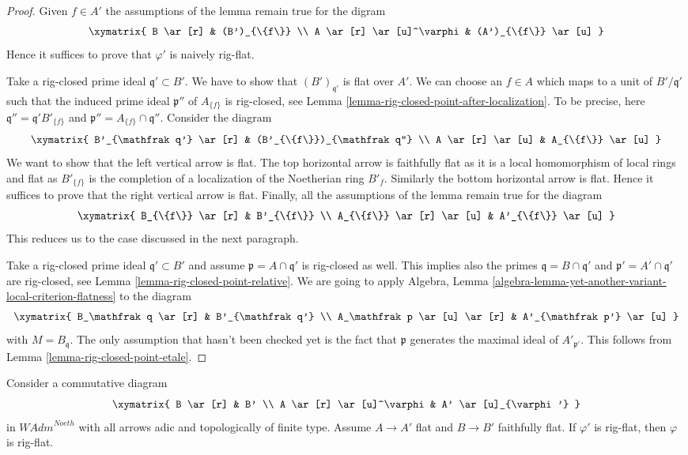 \begin{proof}
Given $f \in A'$ the assumptions of the lemma remain true for the digram
$$
\xymatrix{
B \ar[r] & (B')_{\{f\}} \\
A \ar[r] \ar[u]^\varphi & (A')_{\{f\}} \ar[u]
}
$$
Hence it suffices to prove that $\varphi'$ is naively rig-flat.

\medskip\noindent
Take a rig-closed prime ideal $\mathfrak q' \subset B'$.
We have to show that $(B')_{\mathfrak q'}$ is flat over $A'$.
We can choose an $f \in A$ which maps to a unit of $B'/\mathfrak q'$
such that the induced prime ideal $\mathfrak p''$ of $A_{\{f\}}$ 
is rig-closed, see Lemma \ref{lemma-rig-closed-point-after-localization}.
To be precise, here $\mathfrak q'' = \mathfrak q' B'_{\{f\}}$ and
$\mathfrak p'' = A_{\{f\}} \cap \mathfrak q''$.
Consider the diagram
$$
\xymatrix{
B'_{\mathfrak q'} \ar[r] &
(B'_{\{f\}})_{\mathfrak q''} \\
A \ar[r] \ar[u] &
A_{\{f\}} \ar[u]
}
$$
We want to show that the left vertical arrow is flat.
The top horizontal arrow is faithfully flat as it is a local
homomorphism of local rings and flat as $B'_{\{f\}}$
is the completion of a localization of the Noetherian ring
$B'_f$. Similarly the bottom horizontal arrow is flat.
Hence it suffices to prove that the right vertical arrow is flat.
Finally, all the assumptions of the lemma remain true for the diagram
$$
\xymatrix{
B_{\{f\}} \ar[r] &
B'_{\{f\}} \\
A_{\{f\}} \ar[r] \ar[u] &
A'_{\{f\}} \ar[u]
}
$$
This reduces us to the case discussed in the next paragraph.

\medskip\noindent
Take a rig-closed prime ideal $\mathfrak q' \subset B'$
and assume $\mathfrak p = A \cap \mathfrak q'$ is rig-closed as well.
This implies also the primes $\mathfrak q = B \cap \mathfrak q'$
and $\mathfrak p' = A' \cap \mathfrak q'$ are rig-closed, see
Lemma \ref{lemma-rig-closed-point-relative}.
We are going to apply
Algebra, Lemma \ref{algebra-lemma-yet-another-variant-local-criterion-flatness}
to the diagram
$$
\xymatrix{
B_\mathfrak q \ar[r] &
B'_{\mathfrak q'} \\
A_\mathfrak p \ar[u] \ar[r] &
A'_{\mathfrak p'} \ar[u]
}
$$
with $M = B_\mathfrak q$. The only assumption that hasn't been checked yet
is the fact that $\mathfrak p$ generates the maximal ideal of
$A'_{\mathfrak p'}$. This follows from
Lemma \ref{lemma-rig-closed-point-etale}.
\end{proof}

\begin{lemma}
\label{lemma-rig-flat-local-down}
Consider a commutative diagram
$$
\xymatrix{
B \ar[r] & B' \\
A \ar[r] \ar[u]^\varphi & A' \ar[u]_{\varphi'}
}
$$
in $\textit{WAdm}^{Noeth}$ with all arrows adic and topologically
of finite type. Assume $A \to A'$ flat and $B \to B'$ faithfully flat.
If $\varphi'$ is rig-flat, then $\varphi$ is rig-flat.
\end{lemma}

